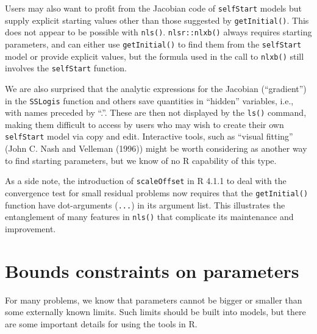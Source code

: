 Users may also want to profit from the Jacobian code of \texttt{selfStart} models
but supply explicit starting values other than those suggested by \texttt{getInitial()}.
This does not appear to be possible with \texttt{nls()}. \texttt{nlsr::nlxb()} always requires
starting parameters, and can either use \texttt{getInitial()} to find them from the \texttt{selfStart}
model or provide explicit values, but the formula used in the call to \texttt{nlxb()}
still involves the \texttt{selfStart} function.

We are also surprised that the
analytic expressions for the Jacobian (``gradient'') in the \texttt{SSLogis} function
and others save quantities in ``hidden''
variables, i.e., with names preceded by ``.''.
These are then not displayed by the \texttt{ls()}
command, making them difficult to access by users who may wish to create
their own \texttt{selfStart} model via copy and edit.
Interactive tools, such as ``visual fitting'' (John C. Nash and Velleman (1996)) might be
worth considering as another way to find starting parameters, but we know of no
R capability of this type.

As a side note, the introduction of \texttt{scaleOffset} in R 4.1.1 to deal with the
convergence test for small residual problems now requires that the \texttt{getInitial()}
function have dot-arguments (\texttt{...}) in its argument list. This illustrates the
entanglement of many features in \texttt{nls()} that complicate its maintenance and
improvement.

\hypertarget{bounds-constraints-on-parameters}{%
\section{Bounds constraints on parameters}\label{bounds-constraints-on-parameters}}

For many problems, we know that parameters cannot be bigger or smaller than some
externally known limits. Such limits should be built into models, but there
are some important details for using the tools in R.

